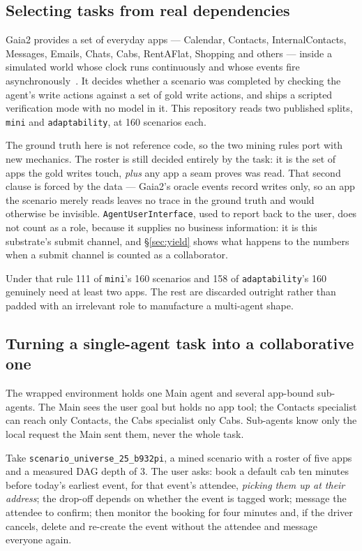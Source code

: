\documentclass[11pt,a4paper]{article}
\begin{document}
\subsection{Selecting tasks from real dependencies}
\label{sec:select}

Gaia2 provides a set of everyday apps --- Calendar, Contacts, InternalContacts, Messages, Emails, Chats, Cabs, RentAFlat, Shopping and others --- inside a simulated world whose clock runs continuously and whose events fire asynchronously~\cite{meta2025are}. It decides whether a scenario was completed by checking the agent's write actions against a set of gold write actions, and ships a scripted verification mode with no model in it. This repository reads two published splits, \texttt{mini} and \texttt{adaptability}, at 160 scenarios each.

The ground truth here is not reference code, so the two mining rules port with new mechanics. The roster is still decided entirely by the task: it is the set of apps the gold writes touch, \emph{plus} any app a seam proves was read. That second clause is forced by the data --- Gaia2's oracle events record writes only, so an app the scenario merely reads leaves no trace in the ground truth and would otherwise be invisible. \texttt{AgentUserInterface}, used to report back to the user, does not count as a role, because it supplies no business information: it is this substrate's submit channel, and \S\ref{sec:yield} shows what happens to the numbers when a submit channel is counted as a collaborator.

Under that rule 111 of \texttt{mini}'s 160 scenarios and 158 of \texttt{adaptability}'s 160 genuinely need at least two apps. The rest are discarded outright rather than padded with an irrelevant role to manufacture a multi-agent shape.

\subsection{Turning a single-agent task into a collaborative one}

The wrapped environment holds one Main agent and several app-bound sub-agents. The Main sees the user goal but holds no app tool; the Contacts specialist can reach only Contacts, the Cabs specialist only Cabs. Sub-agents know only the local request the Main sent them, never the whole task.

Take \texttt{scenario\_universe\_25\_b932pi}, a mined scenario with a roster of five apps and a measured DAG depth of 3. The user asks: book a default cab ten minutes before today's earliest event, for that event's attendee, \emph{picking them up at their address}; the drop-off depends on whether the event is tagged work; message the attendee to confirm; then monitor the booking for four minutes and, if the driver cancels, delete and re-create the event without the attendee and message everyone again.
\end{document}
